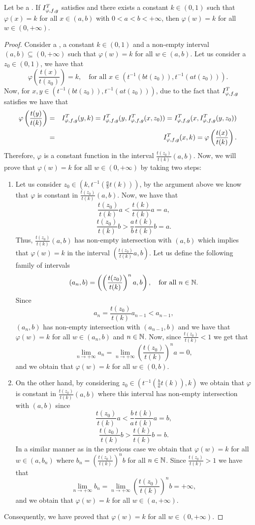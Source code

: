 \begin{lemma}\label{lem:strict:phi_const} Let \IT be a \STP. If $I^T_{\varphi,f,g}$ satisfies \EP and there exists a constant $k \in (0,1)$ such that $\varphi(x)=k$ for all $x \in (a,b)$  with $0<a<b<+\infty$, then $\varphi(w)=k$ for all $w \in (0,+\infty)$.
\end{lemma}
\begin{proof} Consider \IT a \STP, a constant $k \in (0,1)$ and a non-empty interval $(a,b) \subseteq (0,+\infty)$ such that $\varphi(w)=k$ for all $w \in (a,b)$. Let us consider a $z_0 \in (0,1)$, we have that
	$$\varphi \left(\frac{t(x)}{t(z_0)}\right) =k, \quad \text{for all } x \in (t^{-1}(bt(z_0)),t^{-1}(at(z_0))).$$
	Now, for $x,y \in (t^{-1}(bt(z_0)),t^{-1}(at(z_0)))$, due to the fact that $I^T_{\varphi,f,g}$ satisfies \EP we have that
	\begin{eqnarray*}
	\varphi \left(\frac{t(y)}{t(k)}\right) &=&I^T_{\varphi,f,g}(y,k)=I^T_{\varphi,f,g}(y,I^T_{\varphi,f,g}(x,z_0))=I^T_{\varphi,f,g}(x,I^T_{\varphi,f,g}(y,z_0))\\
	 &=& I^T_{\varphi,f,g}(x,k) = \varphi \left(\frac{t(x)}{t(k)}\right).
	\end{eqnarray*}
	Therefore, $\varphi$ is a constant function in the interval $ \frac{t(z_0)}{t(k)}(a,b)$. Now, we will prove that $\varphi(w)=k$ for all $w \in (0,+\infty)$ by taking two steps:
	\begin{enumerate}
		\item Let us consider $z_0 \in (k,t^{-1}(\frac{a}{b}t(k)))$, by the argument above we know that $\varphi$ is constant in $\frac{t(z_0)}{t(k)}(a,b)$. Now, we have that
		$$\frac{t(z_0)}{t(k)}a < \frac{t(k)}{t(k)}a=a,$$
		$$\frac{t(z_0)}{t(k)}b > \frac{a}{b} \frac{t(k)}{t(k)}b=a.$$
		Thus, $\frac{t(z_0)}{t(k)}(a,b)$ has non-empty intersection with $(a,b)$ which implies that $\varphi(w)=k$ in the interval $ \left(\frac{t(z_0)}{t(k)}a,b\right)$. Let us define the following family of intervals
		$$(a_n,b)=\left( \left(\frac{t(z_0)}{t(k)}\right)^na,b\right), \quad \text{for all } n \in \mathbb{N}.$$
		Since
		$$a_n=\frac{t(z_0)}{t(k)}a_{n-1}<a_{n-1},$$
		$(a_n,b)$ has non-empty intersection with $(a_{n-1},b)$ and we have that $\varphi(w)=k$ for all $w \in (a_n,b)$ and $n \in \mathbb{N}$. Now, since $\frac{t(z_0)}{t(k)}<1$ we get that
		$$ \lim_{n \to +\infty}a_n = \lim_{n \to +\infty} \left(\frac{t(z_0)}{t(k)}\right)^na=0,$$
		and we obtain that $\varphi(w)=k$ for all $w \in (0,b)$.
		\item On the other hand, by considering $z_0 \in (t^{-1}(\frac{b}{a}t(k)),k)$ we obtain that $\varphi$ is constant in $\frac{t(z_0)}{t(k)}(a,b)$ where this interval has non-empty intersection with $(a,b)$ since
		$$ \frac{t(z_0)}{t(k)}a < \frac{b}{a}\frac{t(k)}{t(k)}a =b,$$
		$$ \frac{t(z_0)}{t(k)}b> \frac{t(k)}{t(k)}b=b.$$
		In a similar manner as in the previous case we obtain that $\varphi(w)=k$ for all $w \in (a,b_n)$ where $b_n=\left(\frac{t(z_0)}{t(k)}\right)^nb$ for all $n \in \mathbb{N}$. Since $\frac{t(z_0)}{t(k)}>1$ we have that
		$$\lim_{n \to +\infty} b_n = \lim_{n \to +\infty} \left(\frac{t(z_0)}{t(k)}\right)^nb = +\infty,$$
		and we obtain that $\varphi(w)=k$ for all $w \in (a,+\infty)$.
	\end{enumerate}
Consequently, we have proved that $\varphi(w)=k$ for all $w \in (0,+\infty)$.
\end{proof}
